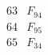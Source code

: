 \documentclass{article}
\begin{document}
{$$\begin{array}{|r|*{7}{r|}}
 & 
 & 
\\
\hline
63 
 & F_{94} &
 & 
 & 
 & 
 & 
 & 
\\
\hline
64 
 & F_{95} &
 & 
 & 
 & 
 & 
 & 
\\
\hline
65 
 & F_{34} &
 & 

\end{array}$$}
\end{document}
